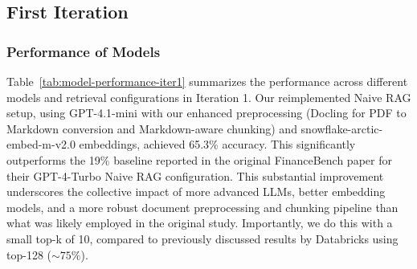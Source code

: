\documentclass[final,5p,times,twopage,twocolumn,a4paper]{elsarticle}
\begin{document}
\subsection{First Iteration}
\label{sec:iter1}

\subsubsection{Performance of Models}
\label{sec:iter1-results}

Table~\ref{tab:model-performance-iter1} summarizes the performance across different models and retrieval configurations in Iteration 1. Our reimplemented Naive RAG setup, using GPT-4.1-mini with our enhanced preprocessing (Docling for PDF to Markdown conversion and Markdown-aware chunking) and snowflake-arctic-embed-m-v2.0 embeddings, achieved 65.3\% accuracy. This significantly outperforms the 19\% baseline reported in the original FinanceBench paper for their GPT-4-Turbo Naive RAG configuration. This substantial improvement underscores the collective impact of more advanced LLMs, better embedding models, and a more robust document preprocessing and chunking pipeline than what was likely employed in the original study. Importantly, we do this with a small top-k of 10, compared to previously discussed results by Databricks using top-128 ($\sim 75\%$).
\end{document}
